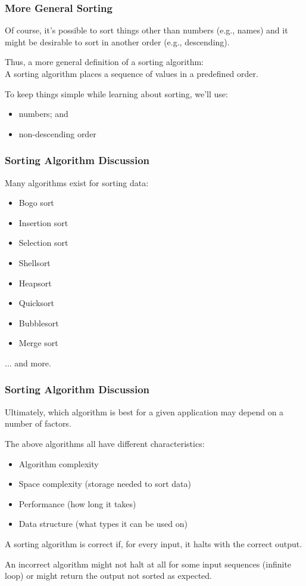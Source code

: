 \begin{frame}
\frametitle{More General Sorting}

Of course, it's possible to sort things other than numbers (e.g., names) and it might be desirable to sort in another order (e.g., descending).

Thus, a more general definition of a sorting algorithm:\\
 A sorting algorithm places a sequence of values in a predefined order.

To keep things simple while learning about sorting, we'll use:
\begin{itemize}
	\item numbers; and
	\item non-descending order
\end{itemize}

\end{frame}

\begin{frame}
\frametitle{Sorting Algorithm Discussion}
Many algorithms exist for sorting data:

\begin{itemize}
	\item Bogo sort
	\item Insertion sort
	\item Selection sort
	\item Shellsort
	\item Heapsort
	\item Quicksort
	\item Bubblesort
	\item Merge sort
\end{itemize}

... and more.

\end{frame}

\begin{frame}
\frametitle{Sorting Algorithm Discussion}

Ultimately, which algorithm is best for a given application may depend on a number of factors.

The above algorithms all have different characteristics:

\begin{itemize}
	\item Algorithm complexity
	\item Space complexity (storage needed to sort data)
	\item Performance (how long it takes)
	\item Data structure (what types it can be used on)
\end{itemize}

A sorting algorithm is correct if, for every input, it halts with the correct output.

An incorrect algorithm might not halt at all for some input sequences (infinite loop) or might return the output not sorted as expected.


\end{frame}




